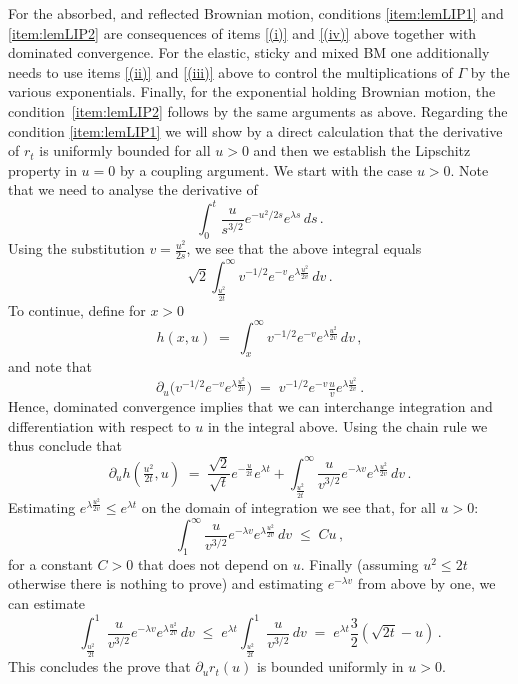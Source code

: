 \documentclass[12pt,a4paper]{article}
\theoremstyle{plain}
\theoremstyle{remark}
\begin{document}
	
	
	
	
	For the absorbed, and reflected Brownian motion, conditions \ref{item:lemLIP1} and \ref{item:lemLIP2} are consequences of items \ref{(i)} and \ref{(iv)} above together with dominated convergence. For the elastic, sticky and mixed BM one additionally needs to use items \ref{(ii)} and \ref{(iii)} above to control the multiplications of $\Gamma$ by the various exponentials. Finally, for the exponential holding Brownian motion, the condition~\ref{item:lemLIP2} follows by the same arguments as above. Regarding the condition \ref{item:lemLIP1} we will show by a direct calculation that the derivative of $r_t$ is uniformly bounded for all $u>0$ and then we establish the Lipschitz property in $u=0$ by a coupling argument. We start with the case $u>0$.
	Note that we need to analyse the derivative of
	\begin{equation*}
		\int_0^t \frac{u}{s^{3/2}} e^{-u^2/2s} e^{\lambda s}\, ds\,.
	\end{equation*} 
	Using the substitution $v=\tfrac{u^2}{2s}$, we see that the above integral equals
	\begin{equation*}
		\sqrt{2}\int_{\tfrac{u^2}{2t}}^\infty v^{-1/2} e^{-v} e^{\lambda \tfrac{u^2}{2v}}\, dv\,.
	\end{equation*}
	To continue, define for $x>0$
	\begin{equation*}
		h(x,u)\;=\; \int_x^\infty v^{-1/2} e^{-v} e^{\lambda \tfrac{u^2}{2v}}\, dv\,,
	\end{equation*}
	and note that
	\begin{equation*}
		\partial_u \big(v^{-1/2} e^{-v} e^{\lambda \tfrac{u^2}{2v}}\big)\;=\; v^{-1/2} e^{-v} \tfrac{u}{v}e^{\lambda \tfrac{u^2}{2v}}\,.
	\end{equation*}
	Hence, dominated convergence implies that we can interchange integration and differentiation with respect to $u$ in the integral above.
	Using the chain rule we thus conclude that
	\begin{equation*}
		\partial_u h(\tfrac{u^2}{2t}, u)
		\;=\; \frac{\sqrt{2}}{\sqrt{t}} e^{-\tfrac{u}{2t}}e^{\lambda t}
		+ \int_{\tfrac{u^2}{2t}}^\infty \frac{u}{v^{3/2}} e^{-\lambda v}e^{\lambda \tfrac{u^2}{2v}}\, dv\,.
	\end{equation*}
	Estimating $e^{\lambda \tfrac{u^2}{2v}}\leq e^{\lambda t}$ on the domain of integration we see that, for all $u>0$:
	\begin{equation*}
		\int_1^\infty \frac{u}{v^{3/2}} e^{-\lambda v}e^{\lambda \tfrac{u^2}{2v}}\, dv\;\leq\; Cu\,,
	\end{equation*}
	for a constant $C>0$ that does not depend on $u$.
	Finally (assuming $u^2\leq 2t$ otherwise there is nothing to prove) and estimating $e^{-\lambda v}$ from above by one, we can estimate
	\begin{equation*}
		\int_{\tfrac{u^2}{2t}}^1 \frac{u}{v^{3/2}} e^{-\lambda v}e^{\lambda \tfrac{u^2}{2v}}\, dv
		\;\leq\; 	e^{\lambda t}\int_{\tfrac{u^2}{2t}}^1\frac{u}{v^{3/2}}\, dv
		\;=\; e^{\lambda t}\frac32 (\sqrt{2t}-u)\,.
	\end{equation*}
	This concludes the prove that $\partial_u r_t(u)$ is bounded uniformly in $u>0$. 
	
\end{document}
